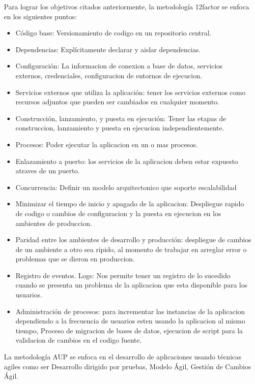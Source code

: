 \noindent Para lograr los objetivos citados anteriormente, la metodología 12factor se enfoca en los siguientes puntos: 
\begin{itemize}
  \item Código base: Versionamiento de codigo en un repositorio central.
  \item Dependencias: Explícitamente declarar y aislar dependencias.
  \item Configuración: La informacion de conexion a base de datos, servicios externos, credenciales, configuracion de entornos de ejecucion. 
  \item Servicios externos que utiliza la aplicación: tener los servicios externos como recursos adjuntos que pueden ser cambiados en cualquier momento.
  \item Construcción, lanzamiento, y puesta en ejecución: Tener las etapas de construccion, lanzamiento y puesta en ejecucion independientemente. 
  \item Procesos: Poder ejecutar la aplicacion en un o mas procesos. 
  \item Enlazamiento a puerto: los servicios de la aplicacion deben estar expuesto atraves de un puerto.
  \item Concurrencia: Definir un modelo arquitectonico que soporte escalabilidad
  \item Minimizar el tiempo de inicio y apagado de la aplicacion: Despliegue rapido de codigo o cambios de configuracion y la puesta en ejecucion en los ambientes de produccion.
  \item Paridad entre los ambientes de desarrollo y producción: despliegue de cambios de un ambiente a otro sea ripido, al momento de trabajar en arreglar error o problemas que se dieron en produccion.
  \item Registro de eventos. Logs: Nos permite tener un registro de lo sucedido cuando se presenta un problema de la aplicacion que esta disponible para los usuarios.
  \item Administración de procesos: para incrementar las instancias de la aplicacion dependiendo a la frecuencia de usuarios esten usando la aplicacion al mismo tiempo, Proceso de migracion de bases de datos, ejecucion de script para la validacion de cambios en el codigo fuente.
\end{itemize}

\noindent La metodología AUP se enfoca en el desarrollo de aplicaciones usando técnicas agiles como ser Desarrollo dirigido por pruebas,  Modelo Ágil, Gestión de Cambios Ágil.

